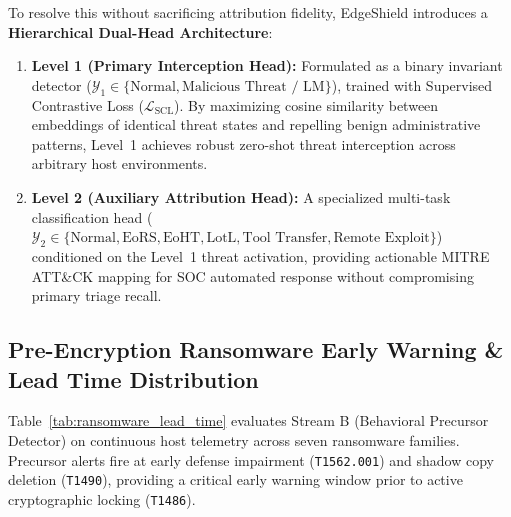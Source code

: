 \documentclass[10pt,journal,compsoc]{IEEEtran}
\begin{document}
To resolve this without sacrificing attribution fidelity, EdgeShield introduces a \textbf{Hierarchical Dual-Head Architecture}:
\begin{enumerate}
    \item \textbf{Level 1 (Primary Interception Head):} Formulated as a binary invariant detector ($\mathcal{Y}_1 \in \{\text{Normal}, \text{Malicious Threat / LM}\}$), trained with Supervised Contrastive Loss ($\mathcal{L}_{\text{SCL}}$). By maximizing cosine similarity between embeddings of identical threat states and repelling benign administrative patterns, Level~1 achieves robust zero-shot threat interception across arbitrary host environments.
    \item \textbf{Level 2 (Auxiliary Attribution Head):} A specialized multi-task classification head ($\mathcal{Y}_2 \in \{\text{Normal}, \text{EoRS}, \text{EoHT}, \text{LotL}, \text{Tool Transfer}, \text{Remote Exploit}\}$) conditioned on the Level~1 threat activation, providing actionable MITRE ATT\&CK mapping for SOC automated response without compromising primary triage recall.
\end{enumerate}

\subsection{Pre-Encryption Ransomware Early Warning \& Lead Time Distribution}
Table~\ref{tab:ransomware_lead_time} evaluates Stream B (Behavioral Precursor Detector) on continuous host telemetry across seven ransomware families. Precursor alerts fire at early defense impairment (\texttt{T1562.001}) and shadow copy deletion (\texttt{T1490}), providing a critical early warning window prior to active cryptographic locking (\texttt{T1486}).
\end{document}
